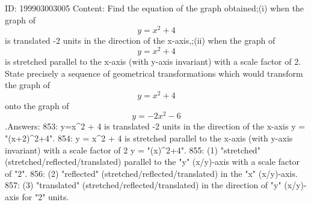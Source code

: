 \documentclass{article}
\begin{document}
ID: 199903003005
Content:
Find the equation of the graph obtained;(i) when the graph of \[y = x^2 + 4\] is translated -2 units in the direction of the x-axis,;(ii) when the graph of \[y = x^2 + 4\] is stretched parallel to the x-axis (with y-axis invariant) with a scale factor of 2. State precisely a sequence of geometrical transformations which would transform the graph of \[y = x^2 + 4\] onto the graph of \[y = -2x^2 - 6\].Answers:
853: y=x^2 + 4 is translated -2 units in the direction of the x-axis \Rightarrow y = "(x+2)^2+4".
854: y = x^2 + 4 is stretched parallel to the x-axis (with y-axis invariant) with a scale factor of 2 \Rightarrow y = "(x)^2+4".
855: (1) "stretched" (stretched/reflected/translated) parallel to the "y" (x/y)-axis with a scale factor of "2".
856: (2) "reflected" (stretched/reflected/translated) in the "x" (x/y)-axis.
857: (3) "translated" (stretched/reflected/translated) in the direction of "y" (x/y)-axis for "2" units.
\end{document}
